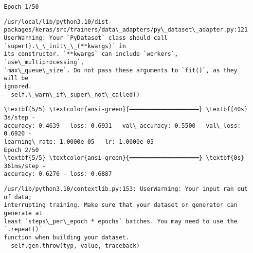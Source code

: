 \documentclass[11pt]{article}
\begin{document}
    \begin{Verbatim}[commandchars=\\\{\}]
Epoch 1/50
    \end{Verbatim}

    \begin{Verbatim}[commandchars=\\\{\}]
/usr/local/lib/python3.10/dist-
packages/keras/src/trainers/data\_adapters/py\_dataset\_adapter.py:121:
UserWarning: Your `PyDataset` class should call `super().\_\_init\_\_(**kwargs)` in
its constructor. `**kwargs` can include `workers`, `use\_multiprocessing`,
`max\_queue\_size`. Do not pass these arguments to `fit()`, as they will be
ignored.
  self.\_warn\_if\_super\_not\_called()
    \end{Verbatim}

    \begin{Verbatim}[commandchars=\\\{\}]
\textbf{5/5} \textcolor{ansi-green}{━━━━━━━━━━━━━━━━━━━━} \textbf{40s} 3s/step -
accuracy: 0.4639 - loss: 0.6931 - val\_accuracy: 0.5500 - val\_loss: 0.6920 -
learning\_rate: 1.0000e-05 - lr: 1.0000e-05
Epoch 2/50
\textbf{5/5} \textcolor{ansi-green}{━━━━━━━━━━━━━━━━━━━━} \textbf{0s} 361ms/step -
accuracy: 0.6276 - loss: 0.6887
    \end{Verbatim}

    \begin{Verbatim}[commandchars=\\\{\}]
/usr/lib/python3.10/contextlib.py:153: UserWarning: Your input ran out of data;
interrupting training. Make sure that your dataset or generator can generate at
least `steps\_per\_epoch * epochs` batches. You may need to use the `.repeat()`
function when building your dataset.
  self.gen.throw(typ, value, traceback)
    \end{Verbatim}
\end{document}
